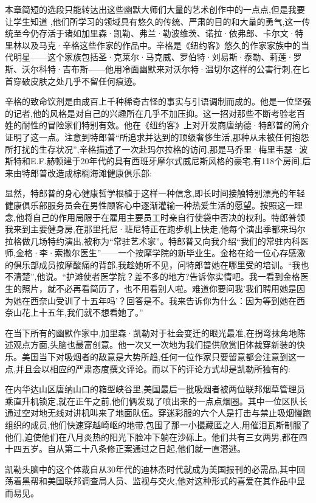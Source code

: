 本章简短的选段只能转达出这些幽默大师们大量的艺术创作中的一点点,但是我要让学生知道 ,他们所学习的领域具有悠久的传统、严肃的目的和大量的勇气,这一传统至今仍存活于诸如加里森·凯勒、弗兰·勒波维茨、诺拉·依弗郎、卡尔文·特里林以及马克·辛格这些作家的作品中。辛格是《纽约客》悠久的作家家族中的当代明星——这个家族包括圣·克莱尔·马克威、罗伯特·刘易斯·泰勒、莉莲·罗斯、沃尔科特·吉布斯——他用冷面幽默来对沃尔特·温切尔这样的公害行刺,在匕首穿破皮肤之处几乎不留任何痕迹。

辛格的致命饮剂是由成百上千种稀奇古怪的事实与引语调制而成的。他是一位坚强的记者,他的风格是对自己的兴趣所在几乎不加压抑。这一招对那些不断考验老百姓的耐性的冒险家们特别有效。他在《纽约客》上对开发商唐纳德·特郎普的简介证明了这一点。注意到特郎普“所追求并达到的顶级奢侈生活,那种从未被任何抱怨所打扰的生存状况”,辛格描述了一次赴玛尔拉格的访问,那是马乔里·梅里韦瑟·波斯特和E.F.赫顿建于20年代的具有西班牙摩尔式威尼斯风格的豪宅,有118个房间,后来由特郎普改造成棕榈海滩健康俱乐部:

显然，特郎普的身心健康哲学根植于这样一种信念,即长时间接触特别漂亮的年轻健康俱乐部服务员会在男性顾客心中逐渐灌输一种热爱生活的愿望。按照这一理念,他将自己的作用局限于在雇用主要员工时亲自行使袋中否决的权利。特郎普领我来到主要健身房,在那里托尼·班尼特正在跑步机上快走,他每个演出季都来玛尔拉格做几场特约演出,被称为“常驻艺术家”。特郎普又向我介绍“我们的常驻内科医师,金格·李·索撒尔医生”——一个按摩学院的新毕业生。金格在给一位心存感激的俱乐部成员按摩酸痛的背部,我趁她听不见，问特郎普她在哪里受的培训。“我也不清楚”,他说。“护滩使者医学院？差不多的地方?告诉你实情吧。我一看到金格医生的照片，就不必再看简历了，也不用看别人啦。难道你要问我’我们聘用她是因为她在西奈山受训了十五年吗’？回答是不。我来告诉你为什么：因为等到她在西奈山花上十五年,我们就不想看她了。”

在当下所有的幽默作家中,加里森·凯勒对于社会变迁的眼光最准,在拐弯抹角地陈述观点方面,头脑也最富创意。他一次又一次地为我们提供欣赏旧体裁穿新装的快乐。美国当下对吸烟者的敌意是大势所趋,任何一位作家只要留意都会注意到这一点,并且会以相应的严肃态度撰文评论。而以下的评论方式却是凯勒所独有的:

在内华达山区唐纳山口的箱型峡谷里,美国最后一批吸烟者被两位联邦烟草管理员乘直升机锁定,就在正午之前,他们俩发现了喷出来的一点点烟圈。其中一位区队长通过空对地无线对讲机叫来了地面队伍。穿迷彩服的六个人是打击与禁止吸烟慢跑组织的成员,他们快速穿越崎岖的地带,包围了那一小撮藏匿之人,用催泪瓦斯制服了他们,迫使他们在八月炎热的阳光下脸冲下躺在沙砾上。他们共有三女两男,都在四十四五岁。自从第二十八条修正案通过之日起,他们就一直潜逃。

凯勒头脑中的这个体裁自从30年代的迪林杰时代就成为美国报刊的必需品,其中回荡着黑帮和美国联邦调查局人员、监视与交火,他对这种形式的喜爱在其作品中显而易见。

